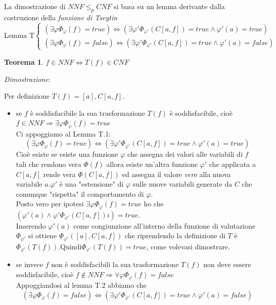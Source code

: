 \documentclass[a4paper]{article}
\newtheorem*{theorem}{Teorema}
\newenvironment{dimostrazione}{\textit{Dimostrazione}:\begin{adjustwidth}{1cm}{}}{\end{adjustwidth}}
\newcommand{\red}{\leq_p}
\begin{document}
La dimostrazione di $NNF \red CNF$ si basa su un lemma derivante dalla costruzione della \textit{funzione di Tseytin}
\begin{equation*}
	\text{Lemma T}\begin{cases}
		(\exists \varphi \Phi_\varphi(f) = true) \Leftrightarrow (\exists \varphi' \Phi_{\varphi'}(C[a,f]) = true \land \varphi'(a) = true)\\
		(\exists \varphi \Phi_\varphi(f) = false) \Leftrightarrow (\exists \varphi' \Phi_{\varphi'}(C[a,f]) = true \land \varphi'(a) = false)
	\end{cases}
\end{equation*}
\begin{theorem}
	$f \in NNF \Leftrightarrow T(f) \in CNF$ 
\end{theorem}
\begin{dimostrazione}
	Per definizione $T(f) = [a],C[a,f]$.
	\begin{itemize}
		\item se $f$ è soddisfacibile la sua trasformazione $T(f)$ è soddisfacibile, cioè $f \in NNF \Rightarrow \exists \varphi \Phi_\varphi(f) = true$\\
			Ci appoggiamo al Lemma T.1: 
			$$(\exists \varphi \Phi_\varphi(f) = true) \Leftrightarrow (\exists \varphi' \Phi_{\varphi'}(C[a,f]) = true \land \varphi'(a) = true)$$
			Cioè esiste se esiste una funzione $\varphi$ che assegna dei valori alle variabili di $f$ tali che rendono vera $\Phi(f)$ allora esiste un'altra funzione $\varphi'$ che applicata a $C[a,f]$ rende vera $\Phi(C[a,f])$ ed assegna il valore \textit{vero} alla nuova variabile $a$.$\varphi'$ è una "estensione" di $\varphi$ sulle nuove variabili generate da $C$ che comunque "rispetta" il comportamento di $\varphi$.\\
			Posto vero per ipotesi $\exists \varphi \Phi_\varphi(f)= true$ ho che $(\varphi'(a) \land \varphi' \Phi_{\varphi'}(C[a,f])i)=true$.\\
			Inserendo $\varphi'(a)$ come congiunzione all'interno della funzione di valutazione $\Phi_{\varphi'}$ si ottiene $\Phi_{\varphi'}([a],C[a,f])$ che riprendendo la definizione di $T$ è $\Phi_{\varphi'}(T(f))$.Quindi$\Phi_{\varphi'}(T(f))=true$, come volevasi dimostrare.
		\item se invece $f$ non è soddisfacibili la sua trasformazione $T(f)$ non deve essere soddisfacibile, cioè $f \notin NNF \Rightarrow \forall \varphi \Phi_\varphi(f) = false$\\
			Appoggiandosi al lemma T.2 abbiamo che
			$$(\exists \varphi \Phi_\varphi(f) = false) \Leftrightarrow (\exists \varphi' \Phi_{\varphi'}(C[a,f]) = true \land \varphi'(a) = false)$$

\end{itemize}
\end{dimostrazione}
\end{document}
